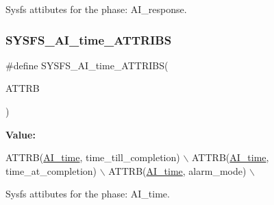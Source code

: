 Sysfs attibutes for the phase\+: A\+I\+\_\+response. 

\mbox{\label{group__sysfs__attrb__init_ga28216f1efe25676be61a0b585d8db84d}} 
\subsubsection{\texorpdfstring{S\+Y\+S\+F\+S\+\_\+\+A\+I\+\_\+time\+\_\+\+A\+T\+T\+R\+I\+BS}{SYSFS\_AI\_time\_ATTRIBS}}
{\footnotesize\ttfamily \#define S\+Y\+S\+F\+S\+\_\+\+A\+I\+\_\+time\+\_\+\+A\+T\+T\+R\+I\+BS(\begin{DoxyParamCaption}\item[{}]{A\+T\+T\+RB }\end{DoxyParamCaption})}

{\bfseries Value\+:}
\begin{DoxyCode}
ATTRB(\hyperlink{AI__gov__phases_8h_a59664fef4d2987410ea13b917756d6acac4e4b20dbef73553532754ad2f423b27}{AI\_time}, time\_till\_completion) \(\backslash\)
            ATTRB(\hyperlink{AI__gov__phases_8h_a59664fef4d2987410ea13b917756d6acac4e4b20dbef73553532754ad2f423b27}{AI\_time}, time\_at\_completion) \(\backslash\)
            ATTRB(\hyperlink{AI__gov__phases_8h_a59664fef4d2987410ea13b917756d6acac4e4b20dbef73553532754ad2f423b27}{AI\_time}, alarm\_mode) \(\backslash\)
\end{DoxyCode}


Sysfs attibutes for the phase\+: A\+I\+\_\+time. 

